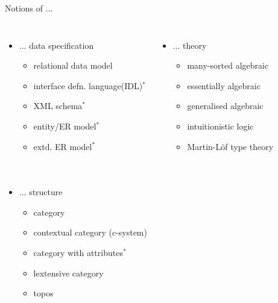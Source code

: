 \documentclass{beamer}
\begin{document}
\begin{frame}{Notions of ...}
\begin{columns}[t]
\column{6.0cm}
\pause \begin{itemize}
\item {... data specification
   \begin{itemize}
	    \item relational data model
			\item interface defn. language{\scriptsize(IDL)}$^*$
			\item {\scriptsize XML} schema$^*$
			\item entity/{\scriptsize ER} model$^*$
			\item extd. {\scriptsize ER} model$^*$
	 \end{itemize}
	 }
\end{itemize}
\column{5cm}
\pause \begin{itemize}
	\item {... theory
   \begin{itemize}
	    \item many-sorted algebraic
			\item essentially algebraic
			\item generalised algebraic
			\item intuitionistic logic
			\item Martin-L\"of type theory
	 \end{itemize}
	}
	\end{itemize}
\end{columns}
\begin{columns}[t]
\column{7.0cm}
\pause \begin{itemize}
\item {... structure
   \begin{itemize}
	    \item category
			\item contextual category (c-system)
			\item category with attributes$^*$
			\item lextensive category
			\item topos
	 \end{itemize}
	}
\end{itemize}
\column{4cm}
\end{columns}
 
 
 
\end{frame}
\end{document}
